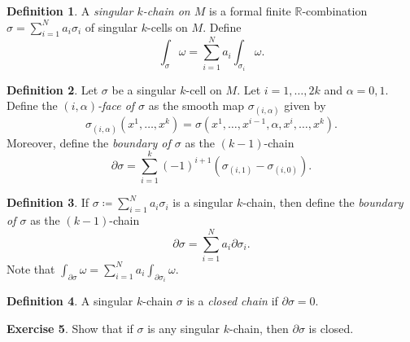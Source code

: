 \documentclass[10pt,letterpaper,cm]{nupset}
\theoremstyle{definition}
\newtheorem{definition}{Definition}[subsection]
\theoremstyle{theorem}
\newtheorem{exercise}[definition]{Exercise}
\theoremstyle{remark}
\newcommand{\R}{\mathbb R}
\newcommand{\1}{\mathbf{1}}
\newcommand{\0}{\vec 0}
\begin{document}
\begin{definition}
A \textit{singular $k$-chain on $M$} is a formal finite  $\R$-combination $\sigma = \sum_{i=1}^Na_i\sigma_i$ of singular $k$-cells on $M$. Define $$ \int_{\sigma} \omega= \sum_{i=1}^N a_i\int_{\sigma_i}\omega .$$
\end{definition}

\begin{definition}
Let $\sigma$ be a singular $k$-cell on $M$. Let $i=1, \ldots, 2k$ and $\alpha =0,1$. Define the \textit{$(i, \alpha)$-face of $\sigma$} as the smooth map $\sigma_{(i, \alpha)}$ given by $$\sigma_{(i, \alpha)}(x^1, \ldots, x^k) = \sigma(x^1,\ldots, x^{i-1}, \alpha, x^{i}, \ldots, x^k).$$ Moreover, define the \textit{boundary of $\sigma$} as the $(k-1)$-chain $$  \partial{\sigma} = \sum_{i=1}^k(-1)^{i+1}(\sigma_{(i,1)}-\sigma_{(i,0)}) .$$
\end{definition}

\begin{definition}
If $\sigma\coloneqq  \sum_{i=1}^Na_i\sigma_i$ is a singular $k$-chain, then define the \textit{boundary of $\sigma$} as the $(k-1)$-chain $$\partial{\sigma} = \sum_{i=1}^N a_i \partial{\sigma_i}   .$$ Note that $\int_{\partial{\sigma}}\omega = \sum_{i=1}^N a_i \int_{\partial{\sigma_i}}\omega$.
\end{definition}

\begin{definition}
A singular $k$-chain $\sigma$ is a \textit{closed chain} if $\partial{\sigma}=0$.
\end{definition}

\begin{exercise}
Show that if $\sigma$ is any singular $k$-chain, then ${\partial{\sigma}}$ is closed.
\end{exercise}
\end{document}
